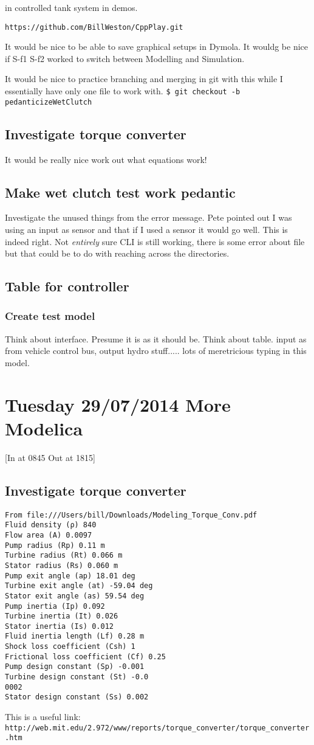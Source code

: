 \documentclass[11pt, oneside]{article}   	%
\begin{document}
in controlled tank system in demos.

\verb+https://github.com/BillWeston/CppPlay.git+

It would be nice to be able to save graphical setups in Dymola.
It wouldg be nice if S-f1 S-f2 worked to switch between Modelling and Simulation.

It would be nice to practice branching and merging in git with this
while I essentially have only one file to work with.
\verb+$ git checkout -b pedanticizeWetClutch+

\subsection{Investigate torque converter}
It would be really nice work out what equations work!
\subsection{Make wet clutch test work pedantic}
Investigate the unused things from the error message.
Pete pointed out I was using an input as sensor and that if I used a
sensor it would go well.   This is indeed right.   Not {\em entirely}
sure CLI is still working, there is some error about file but that
could be to do with reaching across the directories.
\subsection{Table for controller}
\subsubsection{Create test model}
Think about interface.  Presume it is as it should be.  Think about table.  
input as from vehicle control bus, output hydro stuff..... lots of
meretricious typing in this model.

\section{Tuesday 29/07/2014  More Modelica}
[In at 0845 Out at 1815]
\subsection{Investigate torque converter}
\begin{verbatim}
From file:///Users/bill/Downloads/Modeling_Torque_Conv.pdf
Fluid density (ρ) 840 
Flow area (A) 0.0097 
Pump radius (Rp) 0.11 m 
Turbine radius (Rt) 0.066 m 
Stator radius (Rs) 0.060 m
Pump exit angle (ap) 18.01 deg
Turbine exit angle (at) -59.04 deg
Stator exit angle (as) 59.54 deg
Pump inertia (Ip) 0.092 
Turbine inertia (It) 0.026 
Stator inertia (Is) 0.012 
Fluid inertia length (Lf) 0.28 m
Shock loss coefficient (Csh) 1
Frictional loss coefficient (Cf) 0.25
Pump design constant (Sp) -0.001 
Turbine design constant (St) -0.0
0002 
Stator design constant (Ss) 0.002
\end{verbatim}
This is a useful link:\\
\verb+http://web.mit.edu/2.972/www/reports/torque_converter/torque_converter.htm+
\end{document}
